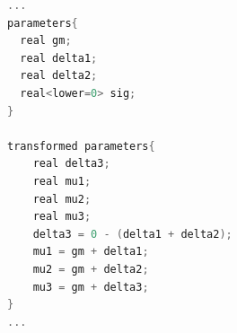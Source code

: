 \begin{lstlisting}[language=C++,label={stan::21_04},caption={制約を入れたコード}]
...
parameters{
  real gm;
  real delta1;
  real delta2;
  real<lower=0> sig;
}

transformed parameters{
    real delta3;
    real mu1;
    real mu2;
    real mu3;
    delta3 = 0 - (delta1 + delta2);
    mu1 = gm + delta1;
    mu2 = gm + delta2;
    mu3 = gm + delta3;
}
...
\end{lstlisting}
